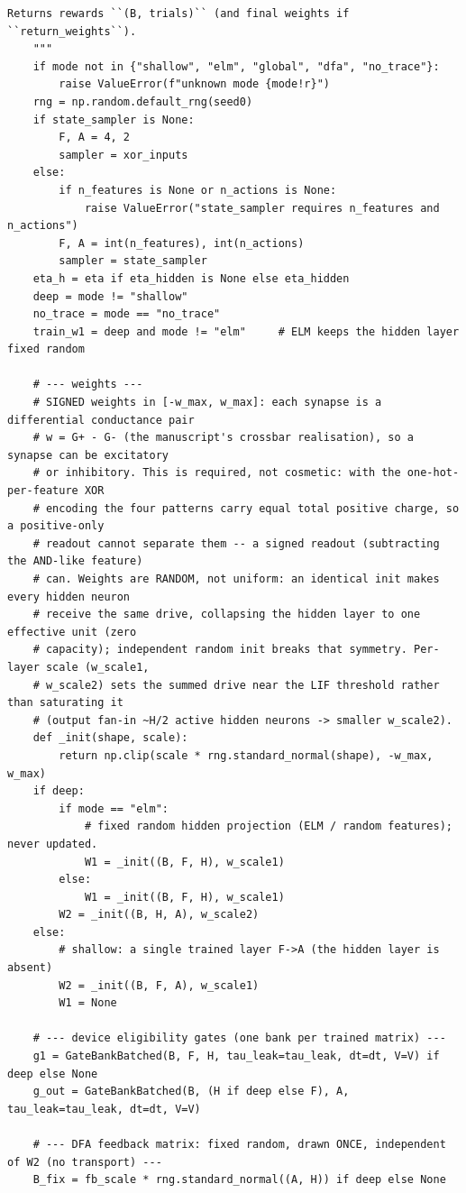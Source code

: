 \begin{lstlisting}[caption={mrl\_trace/deep.py},label={lst:siox-src-deep}]
    Returns rewards ``(B, trials)`` (and final weights if ``return_weights``).
    """
    if mode not in {"shallow", "elm", "global", "dfa", "no_trace"}:
        raise ValueError(f"unknown mode {mode!r}")
    rng = np.random.default_rng(seed0)
    if state_sampler is None:
        F, A = 4, 2
        sampler = xor_inputs
    else:
        if n_features is None or n_actions is None:
            raise ValueError("state_sampler requires n_features and n_actions")
        F, A = int(n_features), int(n_actions)
        sampler = state_sampler
    eta_h = eta if eta_hidden is None else eta_hidden
    deep = mode != "shallow"
    no_trace = mode == "no_trace"
    train_w1 = deep and mode != "elm"     # ELM keeps the hidden layer fixed random

    # --- weights ---
    # SIGNED weights in [-w_max, w_max]: each synapse is a differential conductance pair
    # w = G+ - G- (the manuscript's crossbar realisation), so a synapse can be excitatory
    # or inhibitory. This is required, not cosmetic: with the one-hot-per-feature XOR
    # encoding the four patterns carry equal total positive charge, so a positive-only
    # readout cannot separate them -- a signed readout (subtracting the AND-like feature)
    # can. Weights are RANDOM, not uniform: an identical init makes every hidden neuron
    # receive the same drive, collapsing the hidden layer to one effective unit (zero
    # capacity); independent random init breaks that symmetry. Per-layer scale (w_scale1,
    # w_scale2) sets the summed drive near the LIF threshold rather than saturating it
    # (output fan-in ~H/2 active hidden neurons -> smaller w_scale2).
    def _init(shape, scale):
        return np.clip(scale * rng.standard_normal(shape), -w_max, w_max)
    if deep:
        if mode == "elm":
            # fixed random hidden projection (ELM / random features); never updated.
            W1 = _init((B, F, H), w_scale1)
        else:
            W1 = _init((B, F, H), w_scale1)
        W2 = _init((B, H, A), w_scale2)
    else:
        # shallow: a single trained layer F->A (the hidden layer is absent)
        W2 = _init((B, F, A), w_scale1)
        W1 = None

    # --- device eligibility gates (one bank per trained matrix) ---
    g1 = GateBankBatched(B, F, H, tau_leak=tau_leak, dt=dt, V=V) if deep else None
    g_out = GateBankBatched(B, (H if deep else F), A, tau_leak=tau_leak, dt=dt, V=V)

    # --- DFA feedback matrix: fixed random, drawn ONCE, independent of W2 (no transport) ---
    B_fix = fb_scale * rng.standard_normal((A, H)) if deep else None


\end{lstlisting}
